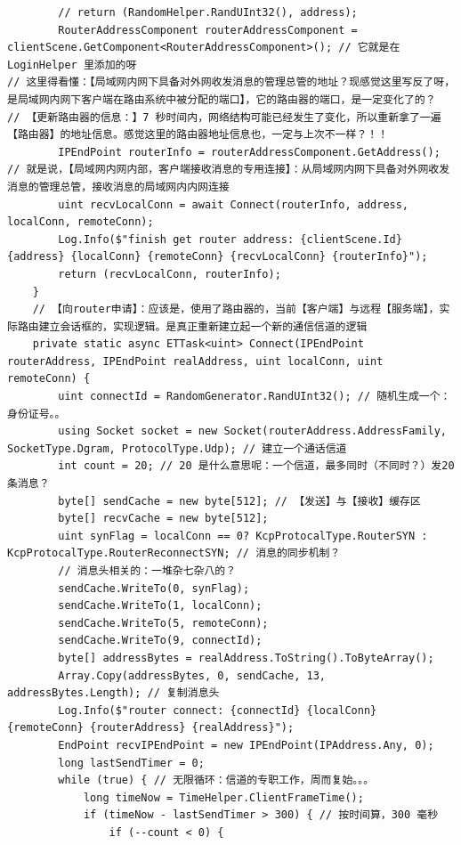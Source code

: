 \documentclass[9pt, b5paper]{article}
\begin{document}
\begin{verbatim}
        // return (RandomHelper.RandUInt32(), address);
        RouterAddressComponent routerAddressComponent = clientScene.GetComponent<RouterAddressComponent>(); // 它就是在 LoginHelper 里添加的呀
// 这里得看懂：【局域网内网下具备对外网收发消息的管理总管的地址？现感觉这里写反了呀，是局域网内网下客户端在路由系统中被分配的端口】，它的路由器的端口，是一定变化了的？
// 【更新路由器的信息：】7 秒时间内，网络结构可能已经发生了变化，所以重新拿了一遍【路由器】的地址信息。感觉这里的路由器地址信息也，一定与上次不一样？！！
        IPEndPoint routerInfo = routerAddressComponent.GetAddress(); 
// 就是说，【局域网内网内部，客户端接收消息的专用连接】：从局域网内网下具备对外网收发消息的管理总管，接收消息的局域网内内网连接
        uint recvLocalConn = await Connect(routerInfo, address, localConn, remoteConn); 
        Log.Info($"finish get router address: {clientScene.Id} {address} {localConn} {remoteConn} {recvLocalConn} {routerInfo}");
        return (recvLocalConn, routerInfo);
    }
    // 【向router申请】：应该是，使用了路由器的，当前【客户端】与远程【服务端】，实际路由建立会话框的，实现逻辑。是真正重新建立起一个新的通信信道的逻辑
    private static async ETTask<uint> Connect(IPEndPoint routerAddress, IPEndPoint realAddress, uint localConn, uint remoteConn) {
        uint connectId = RandomGenerator.RandUInt32(); // 随机生成一个：身份证号。。
        using Socket socket = new Socket(routerAddress.AddressFamily, SocketType.Dgram, ProtocolType.Udp); // 建立一个通话信道
        int count = 20; // 20 是什么意思呢：一个信道，最多同时（不同时？）发20 条消息？
        byte[] sendCache = new byte[512]; // 【发送】与【接收】缓存区
        byte[] recvCache = new byte[512];
        uint synFlag = localConn == 0? KcpProtocalType.RouterSYN : KcpProtocalType.RouterReconnectSYN; // 消息的同步机制？
        // 消息头相关的：一堆杂七杂八的？
        sendCache.WriteTo(0, synFlag);
        sendCache.WriteTo(1, localConn);
        sendCache.WriteTo(5, remoteConn);
        sendCache.WriteTo(9, connectId);
        byte[] addressBytes = realAddress.ToString().ToByteArray();
        Array.Copy(addressBytes, 0, sendCache, 13, addressBytes.Length); // 复制消息头
        Log.Info($"router connect: {connectId} {localConn} {remoteConn} {routerAddress} {realAddress}");
        EndPoint recvIPEndPoint = new IPEndPoint(IPAddress.Any, 0);
        long lastSendTimer = 0;
        while (true) { // 无限循环：信道的专职工作，周而复始。。。
            long timeNow = TimeHelper.ClientFrameTime();
            if (timeNow - lastSendTimer > 300) { // 按时间算，300 毫秒
                if (--count < 0) {

\end{verbatim}
\end{document}
